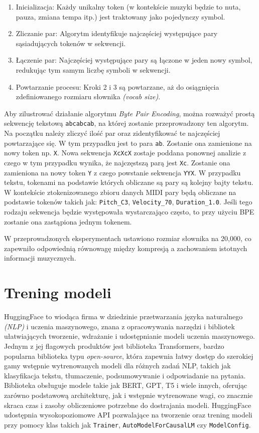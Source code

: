 \documentclass[data-science]{agh-wi} %
\begin{document}
\begin{enumerate}
    \item Inicializacja: Każdy unikalny token (w kontekście muzyki będzie to nuta, pauza, zmiana tempa itp.) jest traktowany jako pojedynczy symbol.
    \item Zliczanie par: Algorytm identyfikuje najczęściej występujące pary sąsiadujących tokenów w sekwencji.
    \item Łączenie par: Najczęściej występujące pary są łączone w jeden nowy symbol, redukując tym samym liczbę symboli w sekwencji.
    \item Powtarzanie procesu: Kroki 2 i 3 są powtarzane, aż do osiągnięcia zdefiniowanego rozmiaru słownika \textit{(vocab size)}.
\end{enumerate}

Aby zilustrować działanie algorytmu \textit{Byte Pair Encoding}, można rozważyć prostą sekwencję tekstową \texttt{abcabcab}, na której zostanie przeprowadzony ten algorytm. Na początku należy zliczyć ilość par oraz zidentyfikować te najczęściej powtarzające się. W tym przypadku jest to para \texttt{ab}. Zostanie ona zamienione na nowy token np. \texttt{X}. Nowa sekwencja \texttt{XcXcX} zostaje poddana ponownej analizie z czego w tym przypadku wynika, że najczęstszą parą jest \texttt{Xc}. Zostanie ona zamieniona na nowy token \texttt{Y} z czego powstanie sekwencja \texttt{YYX}. W przypadku tekstu, tokenami na podstawie których obliczane są pary są kolejny bajty tekstu. W kontekście ztokenizowanego zbioru danych MIDI pary będą obliczane na podstawie tokenów takich jak: \texttt{Pitch\_C3}, \texttt{Velocity\_70}, \texttt{Duration\_1.0}. Jeśli tego rodzaju sekwencja będzie występowała wystarczająco często, to przy użyciu BPE zostanie ona zastąpiona jednym tokenem.

W przeprowadzonych eksperymentach ustawiono rozmiar słownika na 20,000, co zapewniło odpowiednią równowagę między kompresją a zachowaniem istotnych informacji muzycznych.

\section{Trening modeli}
HuggingFace to wiodąca firma w dziedzinie przetwarzania języka naturalnego \textit{(NLP)} i uczenia maszynowego, znana z opracowywania narzędzi i bibliotek ułatwiających tworzenie, wdrażanie i udostępnianie modeli uczenia maszynowego. Jednym z jej flagowych produktów jest biblioteka Transformers, bardzo popularna biblioteka typu \textit{open-source}, która zapewnia łatwy dostęp do szerokiej gamy wstępnie wytrenowanych modeli dla różnych zadań NLP, takich jak klasyfikacja tekstu, tłumaczenie, podsumowywanie i odpowiadanie na pytania. Biblioteka obsługuje modele takie jak BERT, GPT, T5 i wiele innych, oferując zarówno podstawową architekturę, jak i wstępnie wytrenowane wagi, co znacznie skraca czas i zasoby obliczeniowe potrzebne do dostrajania modeli. HuggingFace udostępnia wysokopoziomowe API pozwalające na tworzenie oraz trening modeli przy pomocy klas takich jak \texttt{Trainer}, \texttt{AutoModelForCausalLM} czy \texttt{ModelConfig}.
\end{document}
